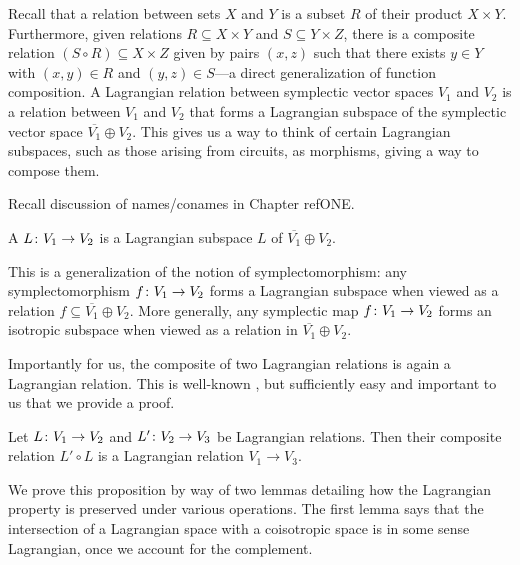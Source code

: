 Recall that a relation between sets $X$ and $Y$ is a subset $R$ of their product
$X \times Y$. Furthermore, given relations $R \subseteq X \times Y$ and $S
\subseteq Y \times Z$, there is a composite relation $(S \circ R) \subseteq X
\times Z$ given by pairs $(x,z)$ such that there exists $y \in Y$ with $(x,y)
\in R$ and $(y,z) \in S$---a direct generalization of function composition. A
Lagrangian relation between symplectic vector spaces $V_1$ and $V_2$ is a
relation between $V_1$ and $V_2$ that forms a Lagrangian subspace of the
symplectic vector space $\overline{V_1} \oplus V_2$. This gives us a
way to think of certain Lagrangian subspaces, such as those arising from
circuits, as morphisms, giving a way to compose them.

Recall discussion of names/conames in Chapter refONE.
\begin{definition}
  A  $L{\colon} V_1 \to V_2$ is a Lagrangian subspace $L$
  of $\overline{V_1} \oplus V_2$. 
\end{definition}

This is a generalization of the notion of symplectomorphism: any symplectomorphism
$f{\colon} V_1 \to V_2$ forms a Lagrangian subspace when viewed as a
relation $f \subseteq \overline{V_1} \oplus V_2$. More generally, any symplectic
map $f{\colon} V_1 \to V_2$ forms an isotropic subspace when viewed as a relation in
$\overline{V_1} \oplus V_2$. 

Importantly for us, the composite of two Lagrangian relations is again a
Lagrangian relation.  This is well-known \cite{Weinstein}, but sufficiently 
easy and important to us that we provide a proof.

\begin{proposition} \label{prop:lagrangian_composition}
  Let $L{\colon} V_1 \to V_2$ and $L'{\colon} V_2 \to V_3$ be Lagrangian relations. Then their
  composite relation $L' \circ L$ is a Lagrangian relation $V_1 \to V_3$.
\end{proposition}

We prove this proposition by way of two lemmas detailing how the Lagrangian
property is preserved under various operations. The first lemma says that the
intersection of a Lagrangian space with a coisotropic space is in some sense
Lagrangian, once we account for the complement.

